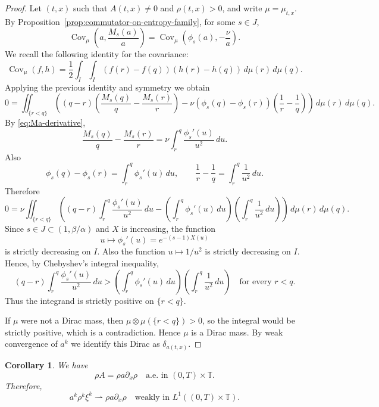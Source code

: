 \documentclass[a4paper,twosided,11pt]{article}
\newcommand{\T}{\mathbb{T}}
\newcommand{\1}{\mathbf{1}}
\DeclareMathOperator*{\Cov}{\operatorname{Cov}}
\theoremstyle{plain}
\newtheorem{corollary}[thm]{Corollary}
\theoremstyle{remark}
\newcommand{\weakto}{\rightharpoonup}
\numberwithin{equation}{section}
\begin{document}
\begin{proof}
Let $(t,x)$ such that $A(t,x)\neq0$ and $\rho(t,x)>0$, and write $\mu=\mu_{t,x}$.
By Proposition~\ref{prop:commutator-on-entropy-family}, for some $s\in J$,
$$
\Cov_\mu \left(a,\frac{M_s(a)}{a}\right)
=
\Cov_\mu \left(\phi_s(a),-\frac{\nu}{a}\right).
$$
We recall the following identity for the covariance: 
$$
\Cov_\mu(f,h)
=
\frac12\int_I\int_I (f(r)-f(q))(h(r)-h(q))\,d\mu(r)\,d\mu(q).
$$
Applying the previous identity and symmetry we obtain
$$
0=
\iint_{\{r<q\}}
\left(
(q-r)\left(\frac{M_s(q)}{q}-\frac{M_s(r)}{r}\right)
-\nu(\phi_s(q)-\phi_s(r))\left(\frac1r-\frac1q\right)
\right)\,d\mu(r)\,d\mu(q).
$$
By \eqref{eq:Ma-derivative},
$$
\frac{M_s(q)}{q}-\frac{M_s(r)}{r}
=
\nu\int_r^q \frac{\phi_s'(u)}{u^2}\,du.
$$
Also
$$
\phi_s(q)-\phi_s(r)=\int_r^q \phi_s'(u)\,du,
\qquad
\frac1r-\frac1q=\int_r^q \frac{1}{u^2}\,du.
$$
Therefore
$$
0=
\nu\iint_{\{r<q\}}
\left(
(q-r)\int_r^q \frac{\phi_s'(u)}{u^2}\,du
-
\left(\int_r^q \phi_s'(u)\,du\right)
\left(\int_r^q \frac{1}{u^2}\,du\right)
\right)\,d\mu(r)\,d\mu(q).
$$
Since $s\in J\subset (1,\beta/\alpha)$ and $X$ is increasing, the function
$$
u\mapsto \phi_s'(u)=e^{-(s-1)X(u)}
$$
is strictly decreasing on $I$. Also the function $u\mapsto 1/u^2$ is strictly decreasing on $I$. Hence, by Chebyshev's integral inequality,
$$
(q-r)\int_r^q \frac{\phi_s'(u)}{u^2}\,du
>
\left(\int_r^q \phi_s'(u)\,du\right)
\left(\int_r^q \frac{1}{u^2}\,du\right)
\quad \text{for every } r<q.
$$
Thus the integrand is strictly positive on $\{r<q\}$.

If $\mu$ were not a Dirac mass, then $\mu\otimes\mu(\{r<q\})>0$, so the integral would be strictly positive, which is a contradiction. Hence $\mu$ is a Dirac mass. By weak convergence of $a^k$ we identify this Dirac as $\delta_{a(t,x)}$.
\end{proof}
\begin{corollary}
\label{cor:A-equals-abar-rhox}
We have
\begin{equation}
\label{eq:A-equals-abar-rhox}
 \rho A = \rho a  \partial_x\rho
 \quad \text{a.e. in } (0,T)\times\T.
\end{equation}
Therefore,
\begin{equation}
\label{eq:limit-j}
 a^k\rho^k\xi^k \weakto \rho a  \partial_x\rho
 \quad \text{weakly in } L^1((0,T)\times\T).
\end{equation}
\end{corollary}
\end{document}
